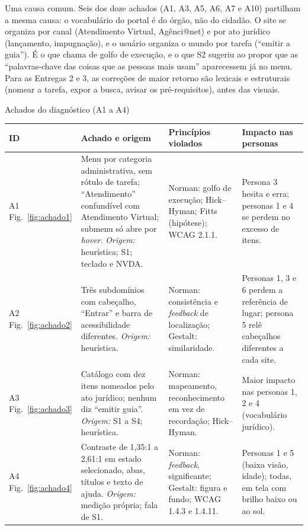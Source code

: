 \documentclass[
  12pt,
  oneside,
  a4paper,
  chapter=TITLE,
  section=TITLE,
  english,
  brazilian
]{abntex2}
\renewcommand{\fonte}[1]{\par\vspace{3pt}{\footnotesize\raggedright\noindent Fonte: #1\par}\vspace{4pt}}%
\begin{document}
Uma causa comum. Seis dos doze achados (A1, A3, A5, A6, A7 e A10)
partilham a mesma causa: o vocabulário do portal é do órgão, não do cidadão. O
site se organiza por canal (Atendimento Virtual, Agênci@net) e por ato jurídico
(lançamento, impugnação), e o usuário organiza o mundo por tarefa (``emitir a
guia''). É o que  chama de golfo de execução, e o que S2 sugeriu ao
propor que as ``palavras-chave das coisas que as pessoas mais usam'' aparecessem
já no menu. Para as Entregas 2 e 3, as correções de maior retorno são lexicais e
estruturais (nomear a tarefa, expor a busca, avisar os pré-requisitos), antes das
visuais.

\begin{quadro}[!htbp]
  \caption{Achados do diagnóstico (A1 a A4)}\label{qua:achados1}
  \centering\footnotesize
  \begin{tabularx}{\textwidth}{|P{1.3cm}|Y|Y|Y|}\hline
    ID & Achado e origem & Princípios violados & Impacto nas personas \\\hline
    A1 \newline Fig.~\ref{fig:achado1} & Menu por categoria administrativa, sem rótulo de tarefa; ``Atendimento'' confundível com Atendimento Virtual; submenu só abre por \textit{hover}. \textit{Origem:} heurística; S1; teclado e NVDA. & Norman: golfo de execução; Hick--Hyman; Fitts (hipótese); WCAG 2.1.1. & Persona 3 hesita e erra; personas 1 e 4 se perdem no excesso de itens. \\\hline
    A2 \newline Fig.~\ref{fig:achado2} & Três subdomínios com cabeçalho, ``Entrar'' e barra de acessibilidade diferentes. \textit{Origem:} heurística. & Norman: consistência e \textit{feedback} de localização; Gestalt: similaridade. & Personas 1, 3 e 6 perdem a referência de lugar; persona 5 relê cabeçalhos diferentes a cada site. \\\hline
    A3 \newline Fig.~\ref{fig:achado3} & Catálogo com dez itens nomeados pelo ato jurídico; nenhum diz ``emitir guia''. \textit{Origem:} S1 a S4; heurística. & Norman: mapeamento, reconhecimento em vez de recordação; Hick--Hyman. & Maior impacto nas personas 1, 2 e 4 (vocabulário jurídico). \\\hline
    A4 \newline Fig.~\ref{fig:achado4} & Contraste de 1,35:1 a 2,61:1 em estado selecionado, abas, títulos e texto de ajuda. \textit{Origem:} medição própria; fala de S1. & Norman: \textit{feedback}, significante; Gestalt: figura e fundo; WCAG 1.4.3 e 1.4.11. & Personas 1 e 5 (baixa visão, idade); todas, em tela com brilho baixo ou ao sol. \\\hline
  \end{tabularx}
  \fonte{Elaborado pelos autores (2026).}
\end{quadro}
\end{document}

